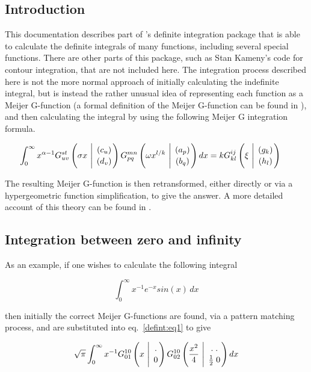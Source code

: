 
\subsection{Introduction}
This documentation describes part of \REDUCE's definite
integration package that is able to calculate the definite integrals of
many functions, including several special functions.  There are other
parts of this package, such as Stan Kameny's code for contour integration,
that are not included here.  The integration process described here is not
the more normal approach of initially calculating the indefinite integral,
but is instead the rather unusual idea of representing each function as a
Meijer G-function (a formal definition of the Meijer G-function can be
found in \cite {Prudnikov}), and then calculating the integral by using
the following Meijer G integration formula.

\begin{equation}
\int_{0}^{\infty} x^{\alpha-1} G^{s t}_{u v} 
\left( \sigma x \  \Bigg\vert \  {( c_u) \atop (d_v)} \right) 
G^{m n}_{p q} \left( \omega x^{l/k} \  \Bigg\vert \ {(a_p) \atop (b_q)}
\right) dx = k G^{i j}_{k l} \left( \xi \ \Bigg\vert \ 
{(g_k) \atop (h_l)} \right)  \hspace{5mm} \label{defint:eq1}
\end{equation}

The resulting Meijer G-function is then retransformed, either directly
or via a hypergeometric function simplification, to give
the answer. A more detailed account of this theory can be found in 
\cite {Adamchik:90}.

\subsection{Integration between zero and infinity}

As an example, if one wishes to calculate the following integral

\begin{displaymath}
\int_{0}^{\infty} x^{-1} e^{-x} sin(x) \, dx
\end{displaymath}

then initially the  correct Meijer G-functions are found, via a 
pattern matching 
process, and are substituted into eq.~\ref{defint:eq1} to give

\begin{displaymath}
\sqrt{\pi} \int_{0}^{\infty} x^{-1} G^{1 0}_{0 1} \left(x 
\ \Bigg\vert \ 
{. \atop 0}\right) G^{1 0}_{0 2}\left(\frac{x^{2}}{4} 
\ \Bigg\vert \ {. \; .  \atop \frac{1}{2} \; 0} \right) dx
\end{displaymath}

